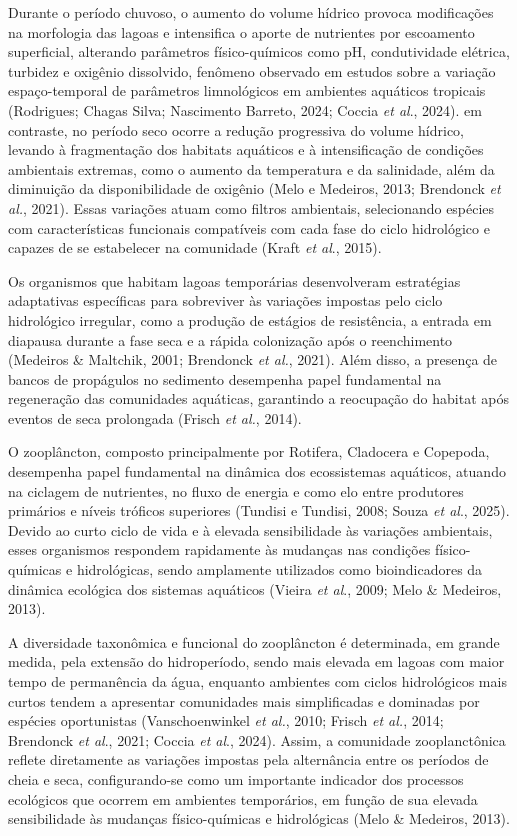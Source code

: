 \documentclass[
  american,
  letterpaper,
  DIV=11,
  numbers=noendperiod]{scrartcl}
\begin{document}
Durante o período chuvoso, o aumento do volume hídrico provoca
modificações na morfologia das lagoas e intensifica o aporte de
nutrientes por escoamento superficial, alterando parâmetros
físico-químicos como pH, condutividade elétrica, turbidez e oxigênio
dissolvido, fenômeno observado em estudos sobre a variação
espaço-temporal de parâmetros limnológicos em ambientes aquáticos
tropicais (Rodrigues; Chagas Silva; Nascimento Barreto, 2024; Coccia
\emph{et al}., 2024). em contraste, no período seco ocorre a redução
progressiva do volume hídrico, levando à fragmentação dos habitats
aquáticos e à intensificação de condições ambientais extremas, como o
aumento da temperatura e da salinidade, além da diminuição da
disponibilidade de oxigênio (Melo e Medeiros, 2013; Brendonck \emph{et
al.}, 2021). Essas variações atuam como filtros ambientais, selecionando
espécies com características funcionais compatíveis com cada fase do
ciclo hidrológico e capazes de se estabelecer na comunidade (Kraft
\emph{et al}., 2015).

Os organismos que habitam lagoas temporárias desenvolveram estratégias
adaptativas específicas para sobreviver às variações impostas pelo ciclo
hidrológico irregular, como a produção de estágios de resistência, a
entrada em diapausa durante a fase seca e a rápida colonização após o
reenchimento (Medeiros \& Maltchik, 2001; Brendonck \emph{et al.},
2021). Além disso, a presença de bancos de propágulos no sedimento
desempenha papel fundamental na regeneração das comunidades aquáticas,
garantindo a reocupação do habitat após eventos de seca prolongada
(Frisch \emph{et al.}, 2014).

O zooplâncton, composto principalmente por Rotifera, Cladocera e
Copepoda, desempenha papel fundamental na dinâmica dos ecossistemas
aquáticos, atuando na ciclagem de nutrientes, no fluxo de energia e como
elo entre produtores primários e níveis tróficos superiores (Tundisi e
Tundisi, 2008; Souza \emph{et al}., 2025). Devido ao curto ciclo de vida
e à elevada sensibilidade às variações ambientais, esses organismos
respondem rapidamente às mudanças nas condições físico-químicas e
hidrológicas, sendo amplamente utilizados como bioindicadores da
dinâmica ecológica dos sistemas aquáticos (Vieira \emph{et al}., 2009;
Melo \& Medeiros, 2013).

A diversidade taxonômica e funcional do zooplâncton é determinada, em
grande medida, pela extensão do hidroperíodo, sendo mais elevada em
lagoas com maior tempo de permanência da água, enquanto ambientes com
ciclos hidrológicos mais curtos tendem a apresentar comunidades mais
simplificadas e dominadas por espécies oportunistas (Vanschoenwinkel
\emph{et al.}, 2010; Frisch \emph{et al.}, 2014; Brendonck \emph{et
al}., 2021; Coccia \emph{et al}., 2024). Assim, a comunidade
zooplanctônica reflete diretamente as variações impostas pela
alternância entre os períodos de cheia e seca, configurando-se como um
importante indicador dos processos ecológicos que ocorrem em ambientes
temporários, em função de sua elevada sensibilidade às mudanças
físico-químicas e hidrológicas (Melo \& Medeiros, 2013).
\end{document}
